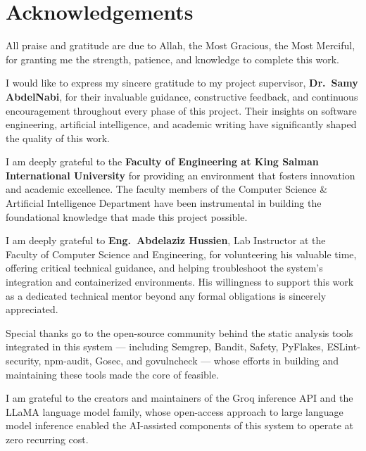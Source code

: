 \chapter*{Acknowledgements}
\thispagestyle{plain}

\begin{singlespace}
All praise and gratitude are due to Allah, the Most Gracious, the Most Merciful, for granting me the strength, patience, and knowledge to complete this work.

I would like to express my sincere gratitude to my project supervisor, \textbf{Dr.\ Samy AbdelNabi}, for their invaluable guidance, constructive feedback, and continuous encouragement throughout every phase of this project. Their insights on software engineering, artificial intelligence, and academic writing have significantly shaped the quality of this work.

I am deeply grateful to the \textbf{Faculty of Engineering at King Salman International University} for providing an environment that fosters innovation and academic excellence. The faculty members of the Computer Science \& Artificial Intelligence Department have been instrumental in building the foundational knowledge that made this project possible.

I am deeply grateful to \textbf{Eng.\ Abdelaziz Hussien}, Lab Instructor at the Faculty of Computer Science and Engineering, for volunteering his valuable time, offering critical technical guidance, and helping troubleshoot the system's integration and containerized environments. His willingness to support this work as a dedicated technical mentor beyond any formal obligations is sincerely appreciated.

Special thanks go to the open-source community behind the static analysis tools integrated in this system --- including Semgrep, Bandit, Safety, PyFlakes, ESLint-security, npm-audit, Gosec, and govulncheck --- whose efforts in building and maintaining these tools made the core of \ACRQA{} feasible.

I am grateful to the creators and maintainers of the Groq inference API and the LLaMA language model family, whose open-access approach to large language model inference enabled the AI-assisted components of this system to operate at zero recurring cost.


\end{singlespace}
